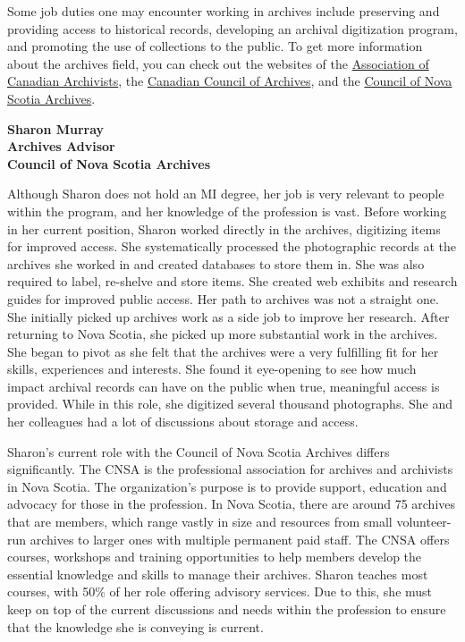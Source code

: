 \documentclass[
  letterpaper,
  DIV=11,
  numbers=noendperiod]{scrreprt}
\begin{document}
Some job duties one may encounter working in archives include preserving
and providing access to historical records, developing an archival
digitization program, and promoting the use of collections to the
public. To get more information about the archives field, you can check
out the websites of the \href{https://archivists.ca/}{Association of
Canadian Archivists}, the \href{http://archivescanada.ca/}{Canadian
Council of Archives}, and the
\href{https://www.councilofnsarchives.ca/}{Council of Nova Scotia
Archives}.

\begin{tcolorbox}[enhanced jigsaw, arc=.35mm, bottomrule=.15mm, bottomtitle=1mm, breakable, colback=white, colbacktitle=quarto-callout-tip-color!10!white, colframe=quarto-callout-tip-color-frame, coltitle=black, left=2mm, leftrule=.75mm, opacityback=0, opacitybacktitle=0.6, rightrule=.15mm, title=\textcolor{quarto-callout-tip-color}{\faLightbulb}\hspace{0.5em}{Meet a professional}, titlerule=0mm, toprule=.15mm, toptitle=1mm]

\textbf{Sharon Murray\\
Archives Advisor\\
Council of Nova Scotia Archives}

Although Sharon does not hold an MI degree, her job is very relevant to
people within the program, and her knowledge of the profession is vast.
Before working in her current position, Sharon worked directly in the
archives, digitizing items for improved access. She systematically
processed the photographic records at the archives she worked in and
created databases to store them in. She was also required to label,
re-shelve and store items. She created web exhibits and research guides
for improved public access. Her path to archives was not a straight one.
She initially picked up archives work as a side job to improve her
research. After returning to Nova Scotia, she picked up more substantial
work in the archives. She began to pivot as she felt that the archives
were a very fulfilling fit for her skills, experiences and interests.
She found it eye-opening to see how much impact archival records can
have on the public when true, meaningful access is provided. While in
this role, she digitized several thousand photographs. She and her
colleagues had a lot of discussions about storage and access.

Sharon's current role with the Council of Nova Scotia Archives differs
significantly. The CNSA is the professional association for archives and
archivists in Nova Scotia. The organization's purpose is to provide
support, education and advocacy for those in the profession. In Nova
Scotia, there are around 75 archives that are members, which range
vastly in size and resources from small volunteer-run archives to larger
ones with multiple permanent paid staff. The CNSA offers courses,
workshops and training opportunities to help members develop the
essential knowledge and skills to manage their archives. Sharon teaches
most courses, with 50\% of her role offering advisory services. Due to
this, she must keep on top of the current discussions and needs within
the profession to ensure that the knowledge she is conveying is current.


\end{tcolorbox}
\end{document}
